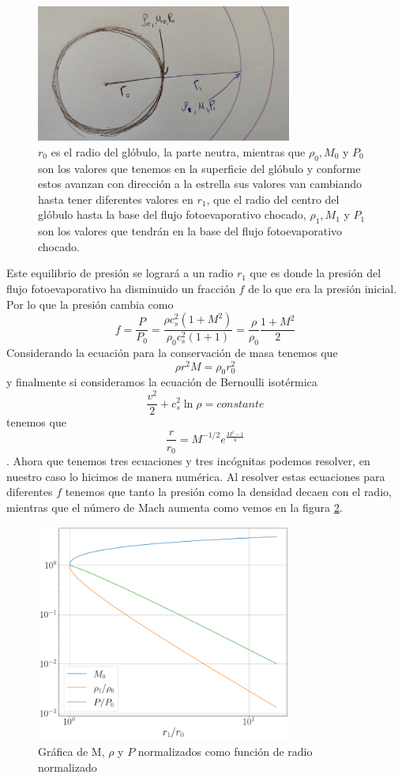 \documentclass{book}
\begin{document}
\begin{figure}[h]
    \centering \includegraphics[width=0.75\textwidth]{images Chapter 2/C2_parameters.jpg}
    \caption{$r_0$ es el radio del glóbulo, la parte neutra, mientras que $\rho_0,M_0$ y $P_0$ son los valores que tenemos en la superficie del glóbulo y conforme estos avanzan con dirección a la estrella sus valores van cambiando hasta tener diferentes valores en $r_1$, que el radio del centro del glóbulo hasta la base del flujo fotoevaporativo chocado, $\rho_1,M_1$ y $P_1$ son los valores que tendrán en la base del flujo fotoevaporativo chocado.}
    \label{fig:parameters}
\end{figure}

Este equilibrio de presión se logrará a un radio $r_1$ que es donde la presión del flujo fotoevaporativo ha disminuido un fracción $f$ de lo que era la presión inicial. Por lo que la presión cambia como 
\[f=\frac{P}{P_0}=\frac{\rho c_s^2(1+M^2)}{\rho_0 c_s^2(1+1)}=\frac{\rho}{\rho_0}\frac{1+M^2}{2}\]
Considerando la ecuación para la conservación de masa tenemos que
\[\rho r^2M	=\rho_0 r_0^2\]
y finalmente si consideramos la ecuación de Bernoulli isotérmica 
\[\frac{v^2}{2}+c_s^2\ln\rho=constante\]
tenemos que 
\[\frac{r}{r_0}=M^{-1/2}e^{\frac{M^2-1}{4}}\] \cite{Dyson:1968}.
Ahora que tenemos tres ecuaciones y tres incógnitas podemos resolver, en nuestro caso lo hicimos de manera numérica. Al resolver estas ecuaciones para diferentes $f$ tenemos que tanto la presión como la densidad decaen con el radio, mientras que el número de Mach aumenta como vemos en la figura \ref{fig:grafica_C2}.

\begin{figure}[h]
    \centering    \includegraphics[width=0.75\textwidth]{images Chapter 2/C2_results.png}
    \caption{Gráfica de M, $\rho$ y $P$ normalizados como función de radio normalizado}
    \label{fig:grafica_C2}
\end{figure}
\end{document}
